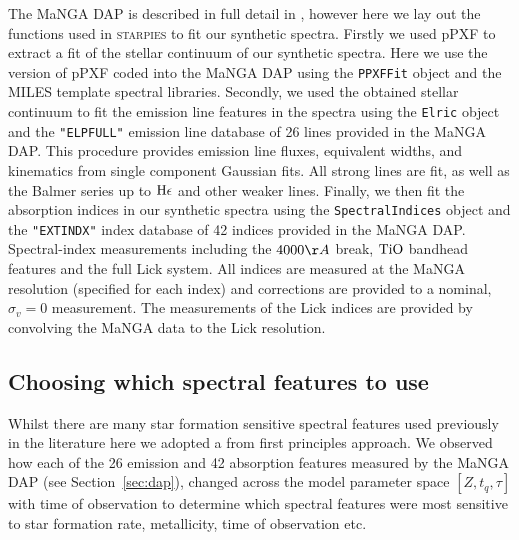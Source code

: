 \documentclass[useAMS,usenatbib]{mn2e}
\begin{document}
The MaNGA DAP is described in full detail in \cite{westfall18}, however here we lay out the functions used in \textsc{starpies} to fit our synthetic spectra. Firstly we used pPXF \citep{cappellari04} to extract a fit of the stellar continuum of our synthetic spectra. Here we use the version of pPXF coded into the MaNGA DAP using the \texttt{PPXFFit} object and the MILES template spectral libraries. Secondly, we used the obtained stellar continuum to fit the emission line features in the spectra using the \texttt{Elric} object and the \texttt{"ELPFULL"} emission line database of 26 lines provided in the MaNGA DAP. This procedure provides emission line fluxes, equivalent widths, and kinematics from single component Gaussian fits. All strong lines are fit, as well as the Balmer series up to $\rm{H}\epsilon$ and other weaker lines. Finally, we then fit the absorption indices in our synthetic spectra using the \texttt{SpectralIndices} object and the \texttt{"EXTINDX"} index database of 42 indices provided in the MaNGA DAP. Spectral-index measurements including the $4000\AA$ break, $\rm{TiO}$ bandhead features and the full Lick system. All indices are measured at the MaNGA resolution (specified for each index) and corrections are provided to a nominal, $\sigma_v = 0$ measurement. The measurements of the Lick indices are provided by convolving the MaNGA data to the Lick resolution. 


\subsection{Choosing which spectral features to use}

Whilst there are many star formation sensitive spectral features used previously in the literature \citep{} here we adopted a from first principles approach. We observed how each of the 26 emission and 42 absorption features measured by the MaNGA DAP (see Section~\ref{sec:dap}), changed across the model parameter space $[Z, t_q, \tau]$ with time of observation to determine which spectral features were most sensitive to star formation rate, metallicity, time of observation etc. 
\end{document}
